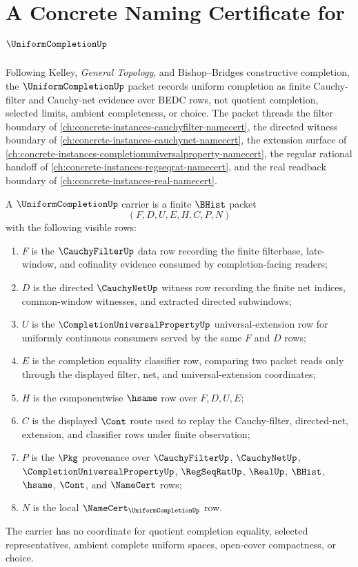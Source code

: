\chapter{A Concrete Naming Certificate for $\UniformCompletionUp$}
\label{ch:concrete-instances-uniformcompletion-namecert}

Following Kelley, \emph{General Topology}, and Bishop--Bridges constructive
completion, the $\UniformCompletionUp$ packet records uniform completion as
finite Cauchy-filter and Cauchy-net evidence over BEDC rows, not quotient
completion, selected limits, ambient completeness, or choice. The packet
threads the filter boundary of
\autoref{ch:concrete-instances-cauchyfilter-namecert}, the directed witness
boundary of \autoref{ch:concrete-instances-cauchynet-namecert}, the extension
surface of \autoref{ch:concrete-instances-completionuniversalproperty-namecert},
the regular rational handoff of
\autoref{ch:concrete-instances-regseqrat-namecert}, and the real readback
boundary of \autoref{ch:concrete-instances-real-namecert}.

\begin{definition}
\label{def:uniform-completion-carrier}
A $\UniformCompletionUp$ carrier is a finite $\BHist$ packet
$$
(F,D,U,E,H,C,P,N)
$$
with the following visible rows:
\begin{enumerate}
\item $F$ is the $\CauchyFilterUp$ data row recording the finite filterbase,
late-window, and cofinality evidence consumed by completion-facing readers;
\item $D$ is the directed $\CauchyNetUp$ witness row recording the finite net
indices, common-window witnesses, and extracted directed subwindows;
\item $U$ is the $\CompletionUniversalPropertyUp$ universal-extension row for
uniformly continuous consumers served by the same $F$ and $D$ rows;
\item $E$ is the completion equality classifier row, comparing two packet reads
only through the displayed filter, net, and universal-extension coordinates;
\item $H$ is the componentwise $\hsame$ row over $F,D,U,E$;
\item $C$ is the displayed $\Cont$ route used to replay the Cauchy-filter,
directed-net, extension, and classifier rows under finite observation;
\item $P$ is the $\Pkg$ provenance over $\CauchyFilterUp$, $\CauchyNetUp$,
$\CompletionUniversalPropertyUp$, $\RegSeqRatUp$, $\RealUp$, $\BHist$,
$\hsame$, $\Cont$, and $\NameCert$ rows;
\item $N$ is the local $\NameCert_{\UniformCompletionUp}$ row.
\end{enumerate}
The carrier has no coordinate for quotient completion equality, selected
representatives, ambient complete uniform spaces, open-cover compactness, or
choice.
\end{definition}

